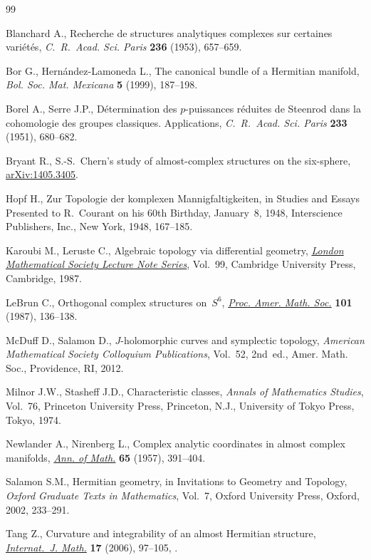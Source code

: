 \begin{thebibliography}{99}
\footnotesize\itemsep=0pt

Blanchard A., Recherche de structures analytiques complexes sur certaines
 vari\'et\'es, \textit{C.~R.~Acad. Sci. Paris} \textbf{236} (1953), 657--659.

Bor G., Hern\'andez-Lamoneda L., The canonical bundle of a {H}ermitian
 manifold, \textit{Bol. Soc. Mat. Mexicana} \textbf{5} (1999), 187--198.

Borel A., Serre J.P., D\'etermination des {$p$}-puissances r\'eduites de
 {S}teenrod dans la cohomologie des groupes classiques. {A}pplications,
 \textit{C.~R.~Acad. Sci. Paris} \textbf{233} (1951), 680--682.

Bryant R., {S}.-{S}.~{C}hern's study of almost-complex structures on the
 six-sphere, \href{https://arxiv.org/abs/1405.3405}{arXiv:1405.3405}.

Hopf H., Zur {T}opologie der komplexen {M}annigfaltigkeiten, in Studies and
 {E}ssays {P}resented to {R}.~{C}ourant on his 60th {B}irthday, {J}anuary~8,
 1948, Interscience Publishers, Inc., New York, 1948, 167--185.

Karoubi M., Leruste C., Algebraic topology via differential geometry,
 \href{https://doi.org/10.1017/CBO9780511629372}{\textit{London Mathematical Society Lecture Note Series}}, Vol.~99, Cambridge
 University Press, Cambridge, 1987.

LeBrun C., Orthogonal complex structures on~{$S^6$}, \href{https://doi.org/10.2307/2046564}{\textit{Proc. Amer. Math.
 Soc.}} \textbf{101} (1987), 136--138.

McDuff D., Salamon D., {$J$}-holomorphic curves and symplectic topology,
 \textit{American Mathematical Society Colloquium Publications}, Vol.~52, 2nd~ed., Amer. Math. Soc., Providence, RI, 2012.

Milnor J.W., Stasheff J.D., Characteristic classes, \textit{Annals of
 Mathematics Studies}, Vol.~76, Princeton University Press, Princeton, N.J.,
 University of Tokyo Press, Tokyo, 1974.

Newlander A., Nirenberg L., Complex analytic coordinates in almost complex
 manifolds, \href{https://doi.org/10.2307/1970051}{\textit{Ann. of Math.}} \textbf{65} (1957), 391--404.

Salamon S.M., Hermitian geometry, in Invitations to Geometry and Topology,
 \textit{Oxford Graduate Texts in Mathematics}, Vol.~7, Oxford University
 Press, Oxford, 2002, 233--291.

Tang Z., Curvature and integrability of an almost {H}ermitian structure,
 \href{https://doi.org/10.1142/S0129167X0600331X}{\textit{Internat.~J. Math.}} \textbf{17} (2006), 97--105,
.

\end{thebibliography}
